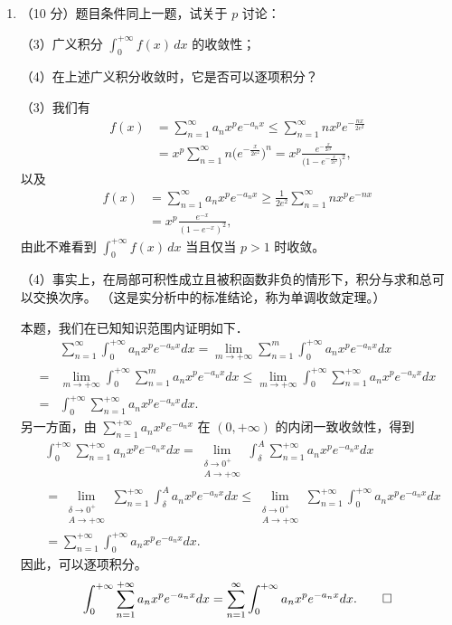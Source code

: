 \begin{enumerate}
\item[六]（10 分）题目条件同上一题，试关于 $p$ 讨论：

（3）广义积分 $\displaystyle\int_{0}^{+\infty} f(x)\,dx$ 的收敛性；

（4）在上述广义积分收敛时，它是否可以逐项积分？

\begin{proofc}[解答]
（3）我们有
\begin{align*}
f(x)& =\sum_{n=1}^{\infty} a_{n} x^{p} e^{-a_{n} x} 
\leq \sum_{n=1}^{\infty} n x^{p} e^{-\frac{nx}{2e^{2}}} \\
&= x^{p} \sum_{n=1}^{\infty} n\big(e^{-\frac{x}{2e^{2}}}\big)^{n}
= x^{p} \frac{e^{-\frac{x}{2e^{2}}}}{\big(1-e^{-\frac{x}{2e^{2}}}\big)^{2}},
\end{align*}
以及
\begin{align*}
f(x)& =\sum_{n=1}^{\infty} a_{n} x^{p} e^{-a_{n} x} \geq \frac{1}{2e^{2}} \sum_{n=1}^{\infty} n x^{p} e^{-nx} \\
& = x^{p} \frac{e^{-x}}{\left(1-e^{-x}\right)^{2}},
\end{align*}
由此不难看到 $\displaystyle\int_{0}^{+\infty} f(x)\,dx$ 当且仅当 $p>1$ 时收敛。

（4）事实上，在局部可积性成立且被积函数非负的情形下，积分与求和总可以交换次序。
（这是实分析中的标准结论，称为单调收敛定理。）

本题，我们在已知知识范围内证明如下．
\begin{align*}
& \sum_{n=1}^{\infty} \int_{0}^{+\infty} a_{n} x^{p} e^{-a_{n} x} dx
=\lim_{m \rightarrow+\infty} \sum_{n=1}^{m} \int_{0}^{+\infty} a_{n} x^{p} e^{-a_{n} x} dx \\
= & \lim_{m \rightarrow+\infty} \int_{0}^{+\infty} \sum_{n=1}^{m} a_{n} x^{p} e^{-a_{n} x} dx 
\leq \lim_{m \rightarrow+\infty} \int_{0}^{+\infty} \sum_{n=1}^{+\infty} a_{n} x^{p} e^{-a_{n} x} dx \\
= & \int_{0}^{+\infty} \sum_{n=1}^{+\infty} a_{n} x^{p} e^{-a_{n} x} dx.
\end{align*}
另一方面，由 $\displaystyle\sum_{n=1}^{+\infty} a_{n} x^{p} e^{-a_{n} x}$ 在 $(0,+\infty)$ 的内闭一致收敛性，得到
\begin{align*}
& \int_{0}^{+\infty} \sum_{n=1}^{+\infty} a_{n} x^{p} e^{-a_{n} x} dx
=\lim_{\substack{\delta \rightarrow 0^+\\A \rightarrow+\infty}} \int_{\delta}^{A} \sum_{n=1}^{+\infty} a_{n} x^{p} e^{-a_{n} x} dx \\
& = \lim _{\substack{\delta \rightarrow 0^+\\A \rightarrow+\infty}} \sum_{n=1}^{+\infty} \int_{\delta}^{A} a_{n} x^{p} e^{-a_{n} x} dx 
\leq \lim _{\substack{\delta \rightarrow 0^+\\A \rightarrow+\infty}} \sum_{n=1}^{+\infty} \int_{0}^{+\infty} a_{n} x^{p} e^{-a_{n} x} dx \\
& = \sum_{n=1}^{+\infty} \int_{0}^{+\infty} a_{n} x^{p} e^{-a_{n} x} dx.
\end{align*}
因此，可以逐项积分。
$$\int_{0}^{+\infty} \sum_{n=1}^{+\infty} a_{n} x^{p} e^{-a_{n} x} dx
=\sum_{n=1}^{\infty} \int_{0}^{+\infty} a_{n} x^{p} e^{-a_{n} x} dx.\qedhere$$
\end{proofc}
\end{enumerate}

